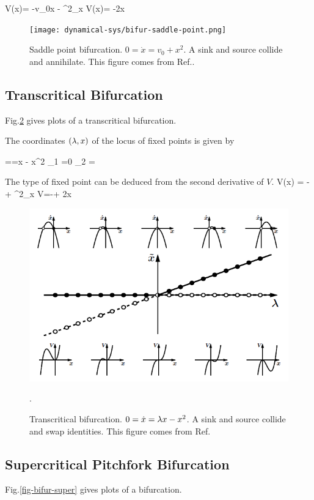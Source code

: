  \beq
 V(x)= -v_0x -
 \implies
 \partial^2_x V(x)= -2x
 \eeq
 
 \begin{figure}[h!]
 \centering
 \texttt{[image: dynamical-sys/bifur-saddle-point.png]}
 \caption{Saddle point bifurcation. $0= \dot{x} = v_0 + x^2$. 
 A sink and source collide and annihilate.
 This
 figure  comes from Ref.\cite{dynamical-fuchs}.}
 \label{fig-bifur-saddle-point}
 \end{figure}
 
\subsection{Transcritical Bifurcation}

Fig.\ref{fig-bifur-trans} gives plots of a transcritical
bifurcation.

The coordinates $(\lambda, x)$ of the locus 
of fixed points is given by

==\lam x - x^2
\implies  {}_1 =0\;\;\;
_2 =\lam
\eeq

 The type of
 fixed point can be 
 deduced from the second derivative
 of $V$.
\beq
V(x) = -\lam{}
+
\implies
\partial^2_x V=-\lam + 2x
\eeq

\begin{figure}[h!]
 \centering
 \includegraphics[width=5in]
 {dynamical-sys/bifur-trans.png}
 \caption{Transcritical bifurcation. $0=\dot{x}=\lambda x - x^2$. 
 A sink and source collide and swap identities.
 This
 figure  comes from Ref.\cite{dynamical-fuchs}}.
 \label{fig-bifur-trans}
 \end{figure}
 
\subsection{Supercritical 
Pitchfork Bifurcation}
Fig.\ref{fig-bifur-super} gives plots of a \supercri
bifurcation.

